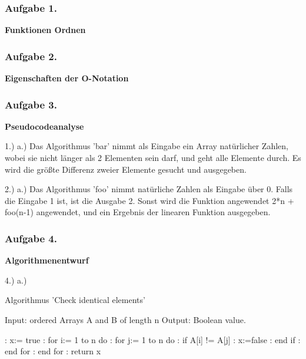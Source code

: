 \documentclass[a4paper,12pt]{article}
\newcommand{\ex}[1]{\newpage\subsubsection*{Aufgabe #1.}}
\begin{document}
	\ex{1}

	\textbf{Funktionen Ordnen}
	\begin{center}
		
	\end{center}

	\ex{2}

	\textbf{Eigenschaften der O-Notation}
	\begin{center}
		
	\end{center}

	\ex{3}

	\textbf{Pseudocodeanalyse}
	\begin{center}
		1.)
		a.)\newline
		Das Algorithmus 'bar' nimmt als Eingabe ein Array natürlicher Zahlen, wobei sie nicht länger als 2 Elementen sein darf, und geht alle Elemente durch.\newline
		Es wird die größte Differenz zweier Elemente gesucht und ausgegeben.\newline
		
		2.)
		a.)\newline
		Das Algorithmus 'foo' nimmt natürliche Zahlen als Eingabe über 0.\newline
		Falls die Eingabe 1 ist, ist die Ausgabe 2.\newline
		Sonst wird die Funktion angewendet 2*n + foo(n-1) angewendet, und ein Ergebnis der linearen Funktion ausgegeben.
	\end{center}

	\ex{4}

	\textbf{Algorithmenentwurf}
	\begin{center}

	4.)
	a.)

	\caption{Algorithmus 'Check identical elements'} \newline
	\text Input:  ordered Arrays A and B of length n\text \newline
	\text Output: \tab Boolean value.\text \newline

	:	\tab x:= true\newline \text
	:	\tab 	for i:= 1 to n do\newline \text
	:	\tab 		for j:= 1 to n do\newline \text
	:	\tab 		if A[i] != A[j]\newline \text
	:	\tab 			x:=false\newline \text
	:	\tab 		end if\newline \text
	:	\tab 	end for\newline \text
	:	\tab end for\newline \text
	:	\tab return x\newline \text
		
	\end{center}
\end{document}
